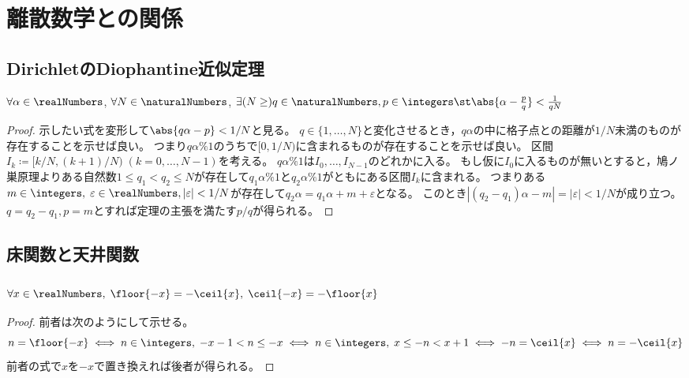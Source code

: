 \chapter{離散数学との関係}
    \section{DirichletのDiophantine近似定理}
        \begin{shadebox}
            $\forall \alpha \in \realNumbers$, $\forall N \in \naturalNumbers$, $\exists (N \geq ) q \in \naturalNumbers, p \in \integers \st \abs{\alpha - \frac{p}{q}} < \frac{1}{qN}$
        \end{shadebox}
        \begin{proof}
            \quad\par
            示したい式を変形して$\abs{q\alpha - p} < 1/N$と見る。
            $q\in\{1,\dotsc,N\}$と変化させるとき，$q\alpha$の中に格子点との距離が$1/N$未満のものが存在することを示せば良い。
            つまり$q\alpha\%1$のうちで$[0,1/N)$に含まれるものが存在することを示せば良い。
            区間$I_k \coloneq [k/N,(k+1)/N)\;(k=0,\dotsc,N-1)$を考える。
            $q\alpha\%1$は$I_0,\dotsc,I_{N-1}$のどれかに入る。
            もし仮に$I_0$に入るものが無いとすると，鳩ノ巣原理よりある自然数$1 \leq q_1 < q_2 \leq N$が存在して$q_1\alpha\%1$と$q_2\alpha\%1$がともにある区間$I_k$に含まれる。
            つまりある$m\in\integers,\;\varepsilon\in\realNumbers,|\varepsilon|<1/N$が存在して$q_2\alpha = q_1\alpha + m + \varepsilon$となる。
            このとき$|(q_2-q_1)\alpha - m|=|\varepsilon|<1/N$が成り立つ。
            $q=q_2-q_1,p=m$とすれば定理の主張を満たす$p/q$が得られる。
        \end{proof}
    \section{床関数と天井関数}
        \subsection{\texorpdfstring{$\forall x\in\realNumbers,\;\floor{-x} = -\ceil{x},\;\ceil{-x} = -\floor{x}$}{∀x∈R, floor(-1) = -ceil(x), ceil(-x) = -floor(x)}}
            \begin{proof}
                \quad\par
                前者は次のようにして示せる。
                \[ n = \floor{-x} \iff n\in\integers,\; -x-1 < n \leq -x \iff n\in\integers,\; x \leq -n < x+1 \iff -n = \ceil{x} \iff n = -\ceil{x} \]
                前者の式で$x$を$-x$で置き換えれば後者が得られる。
            \end{proof}
